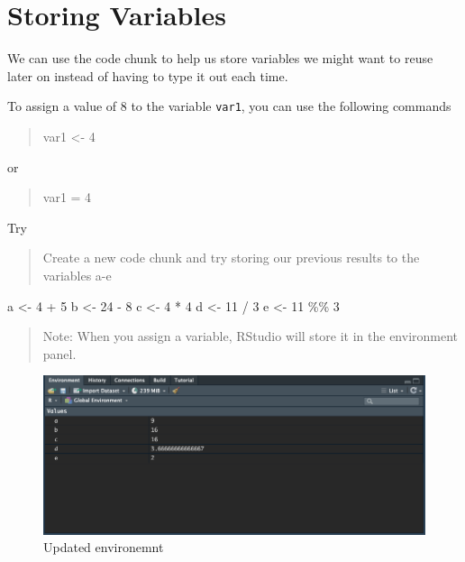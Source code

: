 \documentclass[
]{book}
\newenvironment{Shaded}{\begin{snugshade}}{\end{snugshade}}
\newcommand{\DecValTok}[1]{\textcolor[rgb]{0.00,0.00,0.81}{#1}}
\newcommand{\NormalTok}[1]{#1}
\newcommand{\OtherTok}[1]{\textcolor[rgb]{0.56,0.35,0.01}{#1}}
\newcommand{\SpecialCharTok}[1]{\textcolor[rgb]{0.00,0.00,0.00}{#1}}
\begin{document}
\hypertarget{storing-variables}{%
\section{Storing Variables}\label{storing-variables}}

We can use the code chunk to help us store variables we might want to reuse later on instead of having to type it out each time.

To assign a value of 8 to the variable \texttt{var1}, you can use the following commands

\begin{quote}
var1 \textless- 4
\end{quote}

or

\begin{quote}
var1 = 4
\end{quote}

Try

\begin{quote}
Create a new code chunk and try storing our previous results to the variables a-e
\end{quote}

\begin{Shaded}
\begin{Highlighting}[]
\NormalTok{a }\OtherTok{\textless{}{-}} \DecValTok{4} \SpecialCharTok{+} \DecValTok{5}
\NormalTok{b }\OtherTok{\textless{}{-}} \DecValTok{24} \SpecialCharTok{{-}} \DecValTok{8}
\NormalTok{c }\OtherTok{\textless{}{-}} \DecValTok{4} \SpecialCharTok{*} \DecValTok{4}
\NormalTok{d }\OtherTok{\textless{}{-}} \DecValTok{11} \SpecialCharTok{/} \DecValTok{3}
\NormalTok{e }\OtherTok{\textless{}{-}} \DecValTok{11} \SpecialCharTok{\%\%} \DecValTok{3}
\end{Highlighting}
\end{Shaded}

\begin{quote}
Note: When you assign a variable, RStudio will store it in the environment panel.
\end{quote}

\begin{figure}
\includegraphics[width=12.72in]{images/3.3variableenvironment} \caption{Updated environemnt}\label{fig:unnamed-chunk-14}
\end{figure}
\end{document}
